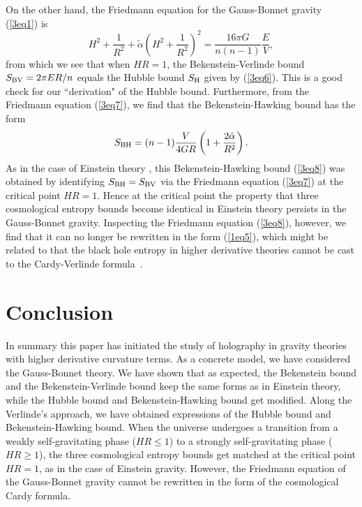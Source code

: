 \documentclass[a4paper,12pt]{article}
\newcommand{\sect}[1]{\setcounter{equation}{0}\section{#1}}
\begin{document}
On the other hand, the Friedmann equation for the Gauss-Bonnet
gravity (\ref{3eq1}) is
\begin{equation}
\label{3eq7}
 H^2 +\frac{1}{R^2} +\tilde \alpha \left (H^2 +\frac{1}{R^2}\right)^2
 = \frac{16\pi G}{n(n-1)}\frac{E}{V},
\end{equation}
from which we see that when $HR=1$, the Bekenstein-Verlinde bound $S_{\rm BV}=
2\pi E R/n$ equals  the Hubble bound $S_{\rm H}$ given by (\ref{3eq6}).
This is a good check for our ``derivation" of the Hubble bound.
Furthermore, from the Friedmann equation (\ref{3eq7}), we find that the
Bekenstein-Hawking bound has the form
\begin{equation}
\label{3eq8}
S_{\rm BH} =(n-1)\frac{V}{4GR}\left( 1 +\frac{2\tilde \alpha}{R^2}\right).
\end{equation}
As in the case of Einstein theory \cite{Verl}, this Bekenstein-Hawking bound
(\ref{3eq8}) was obtained by identifying $S_{\rm BH}=S_{\rm BV}$ via the Friedmann
equation (\ref{3eq7}) at the critical point $HR=1$.  Hence at the critical point
the property that three cosmological entropy bounds  become identical in Einstein theory
persists
in the Gauss-Bonnet gravity. Inspecting the Friedmann equation (\ref{3eq8}), however,
we find that it can no longer be rewritten in the form (\ref{1eq5}), which might be related
to that the black hole entropy in higher derivative theories cannot be cast to the
Cardy-Verlinde formula~\cite{Cai2}.



\sect{Conclusion}

In summary this paper has initiated the study of holography in gravity theories with
higher derivative curvature terms. As a concrete  model, we have considered the Gauss-Bonnet
theory. We have shown that as expected, the Bekenstein bound and the Bekenstein-Verlinde
 bound keep the same forms as in Einstein theory,  while the Hubble bound and
Bekenstein-Hawking bound get modified. Along the Verlinde's approach, we have obtained
 expressions of the Hubble bound and Bekenstein-Hawking bound.  When the universe undergoes a transition from a weakly self-gravitating phase ($HR \le 1$) to a strongly
self-gravitating phase ($HR\ge 1$), the three  cosmological entropy bounds get matched at the
critical point $HR=1$, as in the case of Einstein gravity. However, the Friedmann
equation of the Gauss-Bonnet gravity cannot be rewritten in the form of the cosmological
Cardy formula.
\end{document}
